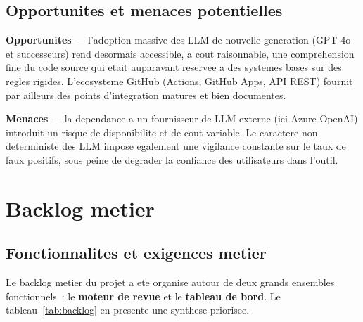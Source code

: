\documentclass[a4paper,12pt,oneside]{report}
\begin{document}
\subsection{Opportunites et menaces potentielles}

\textbf{Opportunites} --- l'adoption massive des LLM de nouvelle generation (GPT-4o et successeurs) rend desormais accessible, a cout raisonnable, une comprehension fine du code source qui etait auparavant reservee a des systemes bases sur des regles rigides. L'ecosysteme GitHub (Actions, GitHub Apps, API REST) fournit par ailleurs des points d'integration matures et bien documentes.

\textbf{Menaces} --- la dependance a un fournisseur de LLM externe (ici Azure OpenAI) introduit un risque de disponibilite et de cout variable. Le caractere non deterministe des LLM impose egalement une vigilance constante sur le taux de faux positifs, sous peine de degrader la confiance des utilisateurs dans l'outil.

\section{Backlog metier}

\subsection{Fonctionnalites et exigences metier}

Le backlog metier du projet a ete organise autour de deux grands ensembles fonctionnels~: le \textbf{moteur de revue} et le \textbf{tableau de bord}. Le tableau~\ref{tab:backlog} en presente une synthese priorisee.
\end{document}
